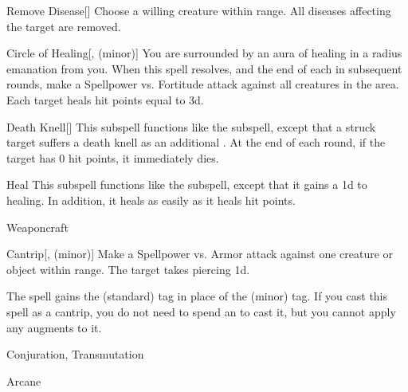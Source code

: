 \begin{ability}[\nth{3}]{Remove Disease}[]
Choose a willing creature within \rngclose range.
All diseases affecting the target are removed.
\end{ability}
\vspace{0.25em}


\begin{ability}[\nth{4}]{Circle of Healing}[,  (minor)]
You are surrounded by an aura of healing in a \areamed radius emanation from you.
When this spell resolves, and the end of each  in subsequent rounds, make a Spellpower vs. Fortitude attack against all creatures in the area.
\hit Each target heals hit points equal to  \minus3d.
\end{ability}
\vspace{0.25em}


\begin{ability}[\nth{4}]{Death Knell}[]
This subspell functions like the  subspell, except that a struck target suffers a death knell as an additional .
At the end of each round, if the target has 0 hit points, it immediately dies.
\end{ability}
\vspace{0.25em}


\begin{ability}[\nth{6}]{Heal}
This subspell functions like the  subspell, except that it gains a \plus1d  to healing.
In addition, it heals  as easily as it heals hit points.
\end{ability}
\vspace{0.25em}

\newpage
\begin{spellsection}{Weaponcraft}

\begin{spellheader}
\end{spellheader}


\begin{ability}{Cantrip}[,  (minor)]
Make a Spellpower vs. Armor attack against one creature or object within \rngmed range.
\hit The target takes piercing  \minus1d.
\end{ability}



 The spell gains the  (standard) tag in place of the  (minor) tag. If you cast this spell as a cantrip,
you do not need to spend an  to cast it,
but you cannot apply any augments to it.


 Conjuration, Transmutation

 Arcane
\end{spellsection}


